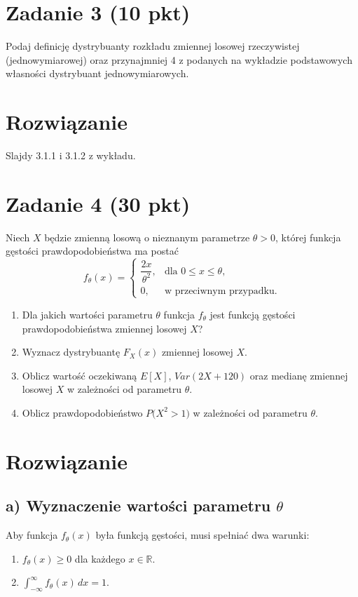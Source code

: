 \documentclass[polish, 10pt]{extarticle}
\begin{document}
\section*{Zadanie 3 (10 pkt)}
Podaj definicję dystrybuanty rozkładu zmiennej losowej rzeczywistej (jednowymiarowej) oraz
przynajmniej 4 z podanych na wykładzie podstawowych własności dystrybuant jednowymiarowych.

\section*{Rozwiązanie}
Slajdy 3.1.1 i 3.1.2 z wykładu.

\section*{Zadanie 4 (30 pkt)}

Niech $X$ będzie zmienną losową o nieznanym parametrze $\theta > 0$, której funkcja
gęstości prawdopodobieństwa ma postać
\[
f_\theta(x) =
\begin{cases}
\dfrac{2x}{\theta^2}, & \text{dla } 0 \leq x \leq \theta,\\[4pt]
0, & \text{w przeciwnym przypadku.}
\end{cases}
\]

\begin{enumerate}[label=\alph*)]
    \item Dla jakich wartości parametru $\theta$ funkcja $f_\theta$ jest
    funkcją gęstości prawdopodobieństwa zmiennej losowej $X$?

    \item Wyznacz dystrybuantę $F_X(x)$ zmiennej losowej $X$.

    \item Oblicz wartość oczekiwaną $E[X]$, $Var(2X + 120)$ oraz medianę
    zmiennej losowej $X$ w zależności od parametru $\theta$.

    \item Oblicz prawdopodobieństwo $P\bigl(X^2 > 1\bigr)$ w zależności od parametru $\theta$.
\end{enumerate}

\section*{Rozwiązanie}

\subsection*{a) Wyznaczenie wartości parametru $\theta$}
Aby funkcja $f_\theta(x)$ była funkcją gęstości, musi spełniać dwa warunki:
\begin{enumerate}
    \item $f_\theta(x) \geq 0$ dla każdego $x \in \mathbb{R}$.
    \item $\int_{-\infty}^{\infty} f_\theta(x) \, dx = 1$.
\end{enumerate}
\end{document}
